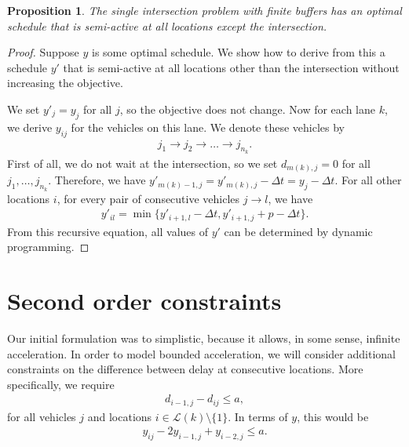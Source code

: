 \documentclass{article}
\theoremstyle{definition}
\theoremstyle{plain}
\newtheorem{proposition}{Proposition}[section]
\begin{document}
\begin{proposition}
  The single intersection problem with finite buffers has an optimal schedule
  that is semi-active at all locations except the intersection.
\end{proposition}
\begin{proof}
  Suppose $y$ is some optimal schedule. We show how to derive from this a
  schedule $y'$ that is semi-active at all locations other than the intersection
  without increasing the objective.

  We set $y'_{j} = y_{j}$ for all $j$, so the objective does not change. Now for
  each lane $k$, we derive $y_{ij}$ for the vehicles on this lane. We denote
  these vehicles by
  \begin{align*}
    j_{1} \rightarrow j_{2} \rightarrow \dots \rightarrow j_{n_{k}} .
  \end{align*}
  First of all, we do not wait at the intersection, so we set $d_{m(k), j} = 0$
  for all $j_{1},\dots, j_{n_{k}}$. Therefore, we have
  $y'_{m(k)-1,j} = y'_{m(k),j} - \Delta t = y_{j} - \Delta t$. For all other
  locations $i$, for every pair of consecutive vehicles $j \rightarrow l$, we
  have
  \begin{align*}
    y'_{il} = \min \{ y'_{i+1, l} - \Delta t, y'_{i+1, j} + p - \Delta t  \}.
  \end{align*}
  From this recursive equation, all values of $y'$ can be determined by dynamic
  programming.
\end{proof}


\section{Second order constraints}

Our initial formulation was to simplistic, because it allows, in some sense, infinite acceleration.
In order to model bounded acceleration, we will consider additional constraints on the difference between delay at consecutive locations.
More specifically, we require
\begin{align*}
  d_{i-1,j} - d_{ij} \leq a ,
\end{align*}
for all vehicles $j$ and locations $i \in \mathcal{L}(k) \setminus \{ 1 \}$.
In terms of $y$, this would be
\begin{align*}
  y_{ij} - 2 y_{i-1,j} + y_{i-2,j} \leq a .
\end{align*}
\end{document}
